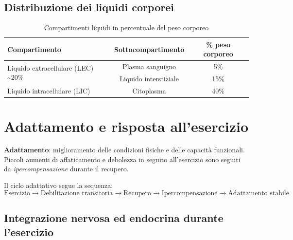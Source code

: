 \documentclass[11pt,a4paper,italian,twoside]{report}
\theoremstyle{definition} %
\begin{document}
\subsection{Distribuzione dei liquidi corporei}
\label{subsec:liquidi}

\begin{table}[htbp]
  \centering
  \caption{Compartimenti liquidi in percentuale del peso corporeo}
  \label{tab:liquidi}
  \begin{tabularx}{0.85\textwidth}{l c c}
    \toprule
    \textbf{Compartimento} & \textbf{Sottocompartimento} & \textbf{\% peso corporeo} \\
    \midrule
    \multirow{2}{*}{Liquido extracellulare (LEC) \textasciitilde 20\%} 
      & Plasma sanguigno & 5\% \\
      & Liquido interstiziale & 15\% \\
    \addlinespace
    Liquido intracellulare (LIC) & Citoplasma & 40\% \\
    \bottomrule
  \end{tabularx}
\end{table}

\section{Adattamento e risposta all'esercizio}
\label{sec:adattamento}

\begin{concetto}
\textbf{Adattamento}: miglioramento delle condizioni fisiche e delle capacità funzionali. Piccoli aumenti di affaticamento e debolezza in seguito all'esercizio sono seguiti da \textit{ipercompensazione} durante il recupero.
\end{concetto}

Il ciclo adattativo segue la sequenza:
\[
\text{Esercizio} \rightarrow \text{Debilitazione transitoria} \rightarrow \text{Recupero} \rightarrow \text{Ipercompensazione} \rightarrow \text{Adattamento stabile}
\]

\subsection{Integrazione nervosa ed endocrina durante l'esercizio}
\label{subsec:integrazione}
\end{document}
